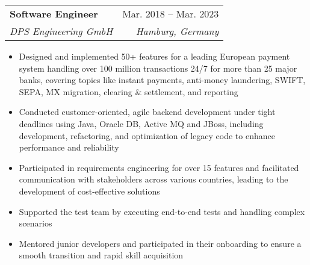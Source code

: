 \documentclass[letterpaper,11pt]{article}
\makeatletter
\newcommand{\resumeItem}[1]{
  \item\small{
    \begin{minipage}[t]{0.99\linewidth} %
      {#1}
    \end{minipage}
    \vspace{1pt} %
  }
}
\newcommand{\resumeSubheading}[4]{
  \vspace{-2pt}\item
    \begin{tabular*}{0.97\textwidth}[t]{l@{\extracolsep{\fill}}r}
      \textbf{#1} & #2 \\
      \textit{\small#3} & \textit{\small #4} \\
    \end{tabular*}\vspace{-7pt}
}
\newcommand{\resumeSubSubheading}[2]{
    \item
    \begin{tabular*}{0.97\textwidth}{l@{\extracolsep{\fill}}r}
      \textit{\small#1} & \textit{\small #2} \\
    \end{tabular*}\vspace{-7pt}
}
\newcommand{\resumeSubHeadingListEnd}{\end{itemize}}
\newcommand{\resumeItemListStart}{\begin{itemize}}
\newcommand{\resumeItemListEnd}{\end{itemize}\vspace{-5pt}}
\makeatother
\begin{document}
    \resumeSubheading
      {Software Engineer}{Mar. 2018 -- Mar. 2023}
      {DPS Engineering GmbH}{Hamburg, Germany}
      \resumeItemListStart
        \resumeItem{Designed and implemented 50+ features for a leading European payment system handling over 100 million transactions 24/7 for more than 25 major banks, covering topics like instant payments, anti-money laundering, SWIFT, SEPA, MX migration, clearing \& settlement, and reporting}
        \resumeItem{Conducted customer-oriented, agile backend development under tight deadlines using Java, Oracle DB, Active MQ and JBoss, including development, refactoring, and optimization of legacy code to enhance performance and reliability}
        \resumeItem{Participated in requirements engineering for over 15 features and facilitated communication with stakeholders across various countries, leading to the development of cost-effective solutions}
        \resumeItem{Supported the test team by executing end-to-end tests and handling complex scenarios}
        \resumeItem{Mentored junior developers and participated in their onboarding to ensure a smooth transition and rapid skill acquisition}
      \resumeItemListEnd
      
\end{document}

